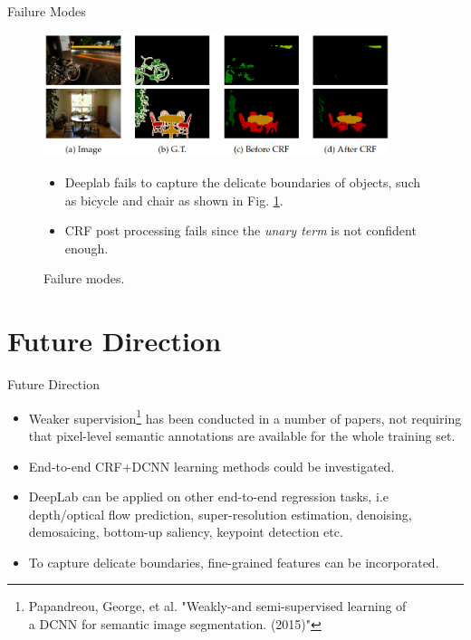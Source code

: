 \documentclass{beamer}
\begin{document}
\begin{frame}{Failure Modes}	
	\begin{figure}
		\centering
		\includegraphics[width=0.90\textwidth]{figure/ss49.png}
		\captionsetup{justification=centering}
		\caption{Failure modes.}
		\label{fig:M10}
		\vspace{-0.4cm}
		\begin{itemize}
		\item Deeplab fails to capture the delicate boundaries of objects, such as bicycle and chair as shown in Fig. \ref{fig:M10}.
		\item CRF post processing fails since the \emph{unary term} is not confident enough.
		\end{itemize}
	\end{figure}
\end{frame}

\section{Future Direction}
\begin{frame}{Future Direction}
\begin{itemize}
\item<1-> {\color{blue}Weaker supervision\footnote{Papandreou, George, et al. "Weakly-and semi-supervised learning of\\ a DCNN for semantic image segmentation. (2015)" }} has been conducted in a number of papers, not requiring that pixel-level semantic annotations are available for the whole training set.
\item<2-> {\color{blue}End-to-end CRF+DCNN} learning methods could be investigated.
\item<3-> DeepLab can be applied on other {\color{blue}end-to-end regression tasks}, i.e depth/optical flow prediction, super-resolution estimation, denoising, demosaicing, bottom-up saliency, keypoint detection etc.
\item<4-> To capture delicate boundaries, {\color{blue}fine-grained features} can be incorporated.
\end{itemize}
\end{frame}
\end{document}
